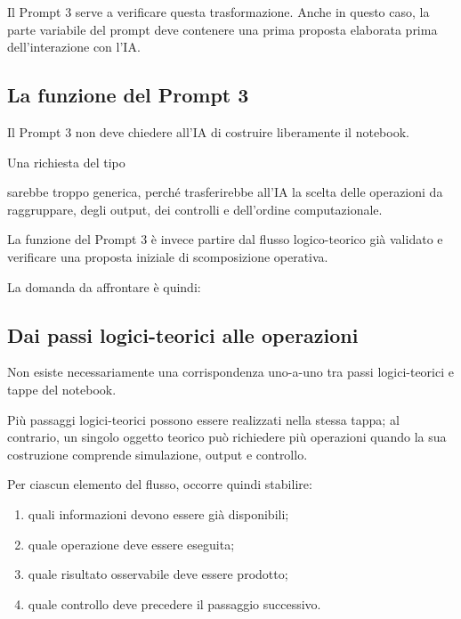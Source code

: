 Il Prompt 3 serve a verificare questa trasformazione. Anche in questo caso, la
parte variabile del prompt deve contenere una prima proposta elaborata prima
dell'interazione con l'IA.

\subsection{La funzione del Prompt 3}

Il Prompt 3 non deve chiedere all'IA di costruire liberamente il notebook.

Una richiesta del tipo

\begin{quote}
\small
{}
\end{quote}

\noindent sarebbe troppo generica, perch\'{e} trasferirebbe all'IA la scelta delle
operazioni da raggruppare, degli output, dei controlli e dell'ordine
computazionale.

La funzione del Prompt 3 \`{e} invece partire dal flusso logico-teorico gi\`{a}
validato e verificare una proposta iniziale di scomposizione operativa.

La domanda da affrontare \`{e} quindi:

\begin{quote}
\small
{}
\end{quote}

\subsection{Dai passi logici-teorici alle operazioni}

Non esiste necessariamente una corrispondenza uno-a-uno tra passi logici-teorici e
tappe del notebook.

Pi\`{u} passaggi logici-teorici possono essere realizzati nella stessa tappa; al
contrario, un singolo oggetto teorico pu\`{o} richiedere pi\`{u} operazioni
quando la sua costruzione comprende simulazione, output e controllo.

Per ciascun elemento del flusso, occorre quindi stabilire:

\begin{enumerate}
\item quali informazioni devono essere gi\`{a} disponibili;

\item quale operazione deve essere eseguita;

\item quale risultato osservabile deve essere prodotto;

\item quale controllo deve precedere il passaggio successivo.
\end{enumerate}


